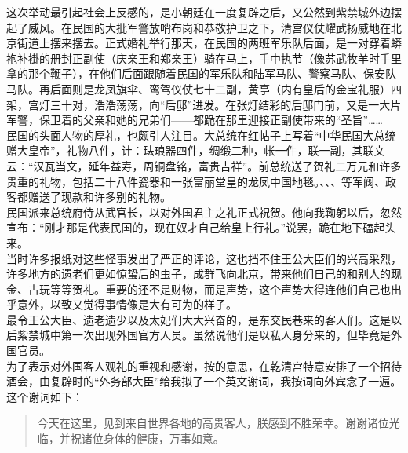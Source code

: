 这次举动最引起社会上反感的，是小朝廷在一度复辟之后，又公然到紫禁城外边摆起了威风。在民国的大批军警放哨布岗和恭敬护卫之下，清宫仪仗耀武扬威地在北京街道上摆来摆去。正式婚礼举行那天，在民国的两班军乐队后面，是一对穿着蟒袍补褂的册封正副使（庆亲王和郑亲王）骑在马上，手中执节（像苏武牧羊时手里拿的那个鞭子），在他们后面跟随着民国的军乐队和陆军马队、警察马队、保安队马队。再后面则是龙凤旗伞、鸾驾仪仗七十二副，黄亭（内有皇后的金宝礼服）四架，宫灯三十对，浩浩荡荡，向“后邸”进发。在张灯结彩的后邸门前，又是一大片军警，保卫着的父亲和她的兄弟们——都跪在那里迎接正副使带来的“圣旨”……\\

民国的头面人物的厚礼，也颇引人注目。大总统在红帖子上写着“中华民国大总统赠大皇帝”，礼物八件，计：珐琅器四件，绸缎二种，帐一件，联一副，其联文云：“汉瓦当文，延年益寿，周铜盘铭，富贵吉祥”。前总统送了贺礼二万元和许多贵重的礼物，包括二十八件瓷器和一张富丽堂皇的龙凤中国地毯。、、、等军阀、政客都赠送了现款和许多别的礼物。\\

民国派来总统府侍从武官长，以对外国君主之礼正式祝贺。他向我鞠躬以后，忽然宣布：“刚才那是代表民国的，现在奴才自己给皇上行礼。”说罢，跪在地下磕起头来。\\

当时许多报纸对这些怪事发出了严正的评论，这也挡不住王公大臣们的兴高采烈，许多地方的遗老们更如惊蛰后的虫子，成群飞向北京，带来他们自己的和别人的现金、古玩等等贺礼。重要的还不是财物，而是声势，这个声势大得连他们自己也出乎意外，以致又觉得事情像是大有可为的样子。\\

最令王公大臣、遗老遗少以及太妃们大大兴奋的，是东交民巷来的客人们。这是以后紫禁城中第一次出现外国官方人员。虽然说他们是以私人身分来的，但毕竟是外国官员。\\

为了表示对外国客人观礼的重视和感谢，按的意思，在乾清宫特意安排了一个招待酒会，由复辟时的“外务部大臣”给我拟了一个英文谢词，我按词向外宾念了一遍。这个谢词如下：\\

\begin{quote}
	今天在这里，见到来自世界各地的高贵客人，朕感到不胜荣幸。谢谢诸位光临，并祝诸位身体的健康，万事如意。\\
\end{quote}

